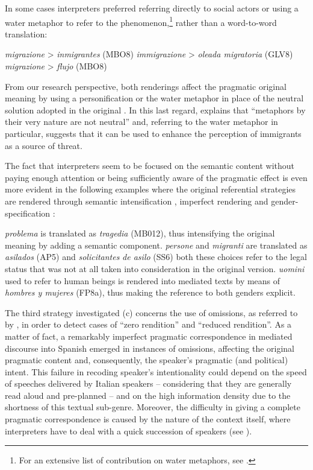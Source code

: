 \documentclass[output=paper]{langscibook}
\begin{document}
In some cases interpreters preferred referring directly to social actors  or using a water metaphor  to refer to the phenomenon,\footnote{For an extensive list of contribution on water metaphors, see \citet[12]{Taylor2020}.} rather than a word-to-word translation:

\ea\label{ex:mori:3}
\textit{migrazione} > \textit{inmigrantes} (MBO8)
\z
\ea\label{ex:mori:4}
\textit{immigrazione} > \textit{oleada migratoria} (GLV8)\\
\textit{migrazione} > \textit{flujo} (MBO8)
\z

From our research perspective, both renderings affect the pragmatic original meaning by using a personification  or the water metaphor in place of the neutral solution adopted in the original . In this last regard, \citet[3]{Taylor2020} explains that “metaphors by their very nature are not neutral” and, referring to the water metaphor in particular, \citet[269]{Marlow2015} suggests that it can be used to enhance the perception of immigrants as a source of threat.

The fact that interpreters seem to be focused on the semantic content without paying enough attention or being sufficiently aware of the pragmatic effect is even more evident in the following examples where the original referential strategies are rendered through semantic intensification , imperfect rendering  and gender-specification :

\ea\label{ex:mori:5}
\textit{problema} is translated as \textit{tragedia} (MB012), thus intensifying the original meaning by adding a semantic component.
\z
\ea\label{ex:mori:6}
\textit{persone} and \textit{migranti} are translated as \textit{asilados} (AP5) and \textit{solicitantes} \textit{de asilo} (SS6) both these choices refer to the legal status that was not at all taken into consideration in the original version.
\z
\ea\label{ex:mori:7}
\textit{uomini} used to refer to human beings is rendered into mediated texts by means of \textit{hombres y mujeres} (FP8a), thus making the reference to both genders explicit.
\z


The third strategy investigated (c) concerns the use of omissions, as referred to by \citet[108]{Wadensjoe1998}, in order to detect cases of “zero rendition” and “reduced rendition”. As a matter of fact, a remarkably imperfect pragmatic correspondence in mediated discourse into Spanish emerged in instances of omissions, affecting the original pragmatic content and, consequently, the speaker’s pragmatic (and political) intent. This failure in recoding speaker’s intentionality could depend on the speed of speeches delivered by Italian speakers -- considering that they are generally read aloud and pre-planned -- and on the high information density due to the shortness of this textual sub-genre. Moreover, the difficulty in giving a complete pragmatic correspondence is caused by the nature of the context itself, where interpreters have to deal with a quick succession of speakers (see ).
\end{document}
